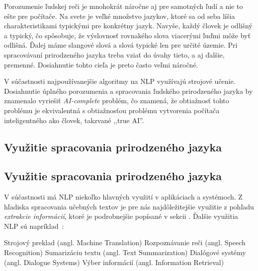 Porozumenie ľudskej reči je mnohokrát náročne aj pre samotných ľudí a nie to ešte pre počítače. Na svete je veľké množstvo jazykov, ktoré sa od seba líšia charakteristikami typickými pre konkrétny jazyk. Navyše, každý človek je odlišný a typický, čo spôsobuje, že výslovnosť rovnakého slova viacerými ľuďmi môže byť odlišná. Ďalej máme slangové slová a slová typické len pre určité územie. Pri spracovávaní prirodzeného jazyka treba vziať do úvahy tieto, a aj ďalšie, premenné. Dosiahnutie tohto cieľa je preto často veľmi náročné.

V súčastnosti najpoužívanejšie algoritmy na NLP využívajú strojové učenie. Dosiahnutie úplného porozumenia a spracovania ľudského prirodzeného jazyka by znamenalo vyriešiť \textit{AI-complete} problém, čo znamená, že obtiažnosť tohto problému je ekvivalentná s obtiažnosťou problému vytvorenia počítača inteligentného ako človek, takzvané ,,true AI''.

%
%
{
	\subsection{Využitie spracovania prirodzeného jazyka}
}
{
	\subsection{Využitie spracovania prirodzeného jazyka}
}
\label{subsec:useofnlp}
V súčastnosti má NLP niekoľko hlavných využití v aplikáciach a systémoch. Z hľadiska spracovania učebných textov je pre nás najdôležitejšie využitie z pohľadu \textit{extrakcie informácií}, ktoré je podrobnejšie popísané v sekcii . Ďalšie využitia NLP sú napríklad~\cite{Preeti}:
\begin{my_itemize}
	\myitem Strojový preklad (angl. Machine Translation)
	\myitem Rozpoznávanie reči (angl. Speech Recognition)
	\myitem Sumarizáciu textu (angl. Text Summarization)
	\myitem Dialógové systémy (angl. Dialogue Systems)
	\myitem Výber informácií (angl. Information Retrieval)
\end{my_itemize}

